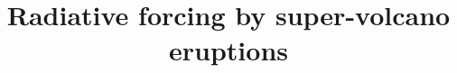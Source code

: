 \documentclass{ametsocV6.1}
\title{Radiative forcing by super-volcano eruptions}
\affiliation{
  \aff{a}{UiT The Arctic University of Norway, Tromsø, Norway}
}
\begin{document}
\maketitle{} \glsresetall{}

%
%
%
%
%
%

%



\end{document}
